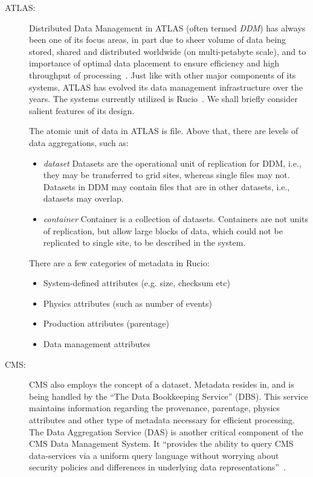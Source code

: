 \begin{description}
\item[ATLAS:] Distributed Data Management in ATLAS (often termed \textit{DDM}) has always been one of its focus areas, in part due to sheer volume of
data being stored, shared and distributed worldwide (on multi-petabyte scale), and to importance of optimal data placement to ensure efficiency
and high throughput of processing~\cite{atlas_ddm_chep12}. Just like with other major components of its systems, ATLAS has evolved its
data management infrastructure over the years. The systems currently utilized is Rucio~\cite{rucio_chep13}. We shall briefly consider salient features of its design.

The atomic unit of data in ATLAS is file. Above that, there are levels of data aggregations, such as:
\begin{itemize}
\item \textit{dataset} Datasets are the operational unit of replication for DDM, i.e., they may be transferred to grid sites, whereas single files
may not. Datasets in DDM may contain files that are in other datasets, i.e., datasets may overlap.
\item \textit{container} Container is a collection of datasets. Containers are not units of replication, but allow
large blocks of data, which could not be replicated to single site, to be described in the system.
\end{itemize}

There are a few categories of metadata in Rucio:
\begin{itemize}
\item  System-defined attributes (e.g. size, checksum etc)
\item Physics attributes (such as number of events)
\item Production attributes (parentage)
\item Data management attributes
\end{itemize}

\item[CMS:] CMS also employs the concept of a dataset. Metadata resides in, and is being handled by the ``The Data Bookkeeping Service'' (DBS).
This service maintains information regarding the provenance, parentage, physics attributes and other type of metadata necessary for efficient processing.
The Data Aggregation Service (DAS)  is another critical component of the CMS Data Management System. It ``provides the ability to query CMS data-services via
a uniform query language without worrying about security policies and differences in underlying data representations''~\cite{phedex_chep13}.

\end{description}

